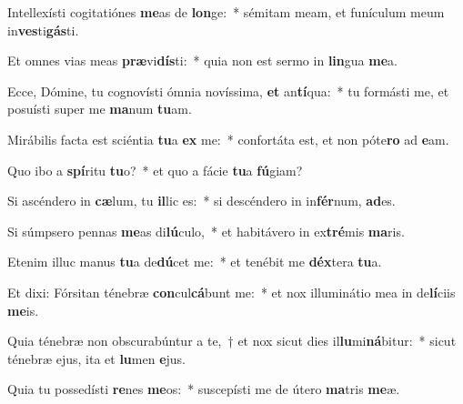 \item Intellexísti cogitatiónes \textbf{me}as de \textbf{lon}ge:~* sémitam meam, et funículum meum in\textbf{ves}ti\textbf{gás}ti.
\item Et omnes vias meas \textbf{præ}vi\textbf{dís}ti:~* quia non est sermo in \textbf{lin}gua \textbf{me}a.
\item Ecce, Dómine, tu cognovísti ómnia novíssima, \textbf{et} an\textbf{tí}qua:~* tu formásti me, et posuísti super me \textbf{ma}num \textbf{tu}am.
\item Mirábilis facta est sciéntia \textbf{tu}a \textbf{ex} me:~* confortáta est, et non póte\textbf{ro} ad \textbf{e}am.
\item Quo ibo a \textbf{spí}ritu \textbf{tu}o?~* et quo a fácie \textbf{tu}a \textbf{fú}giam?
\item Si ascéndero in \textbf{cæ}lum, tu \textbf{il}lic es:~* si descéndero in in\textbf{fér}num, \textbf{ad}es.
\item Si súmpsero pennas \textbf{me}as di\textbf{lú}culo,~* et habitávero in ex\textbf{tré}mis \textbf{ma}ris.
\item Etenim illuc manus \textbf{tu}a de\textbf{dú}cet me:~* et tenébit me \textbf{déx}tera \textbf{tu}a.
\item Et dixi: Fórsitan ténebræ \textbf{con}cul\textbf{cá}bunt me:~* et nox illuminátio mea in de\textbf{lí}ciis \textbf{me}is.
\item Quia ténebræ non obscurabúntur a te,~† et nox sicut dies il\textbf{lu}mi\textbf{ná}bitur:~* sicut ténebræ ejus, ita et \textbf{lu}men \textbf{e}jus.
\item Quia tu possedísti \textbf{re}nes \textbf{me}os:~* suscepísti me de útero \textbf{ma}tris \textbf{me}æ.
